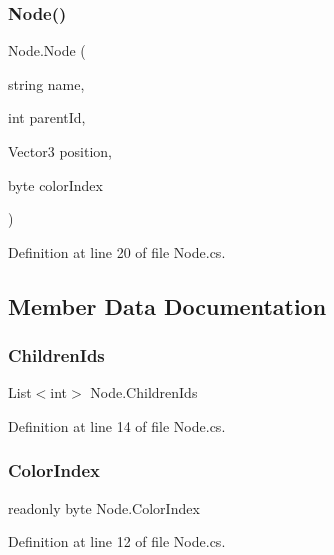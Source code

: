 \subsubsection{\texorpdfstring{Node()}{Node()}}
{\footnotesize\ttfamily Node.\+Node (\begin{DoxyParamCaption}\item[{string}]{name,  }\item[{int}]{parent\+Id,  }\item[{Vector3}]{position,  }\item[{byte}]{color\+Index }\end{DoxyParamCaption})}



Definition at line 20 of file Node.\+cs.



\subsection{Member Data Documentation}
\mbox{\label{class_node_ac49c69569aa07d54598b6b793ba26a31}} 
\subsubsection{\texorpdfstring{ChildrenIds}{ChildrenIds}}
{\footnotesize\ttfamily List$<$int$>$ Node.\+Children\+Ids}



Definition at line 14 of file Node.\+cs.

\mbox{\label{class_node_a2255f55bc7904392510365aa7c7069f6}} 
\subsubsection{\texorpdfstring{ColorIndex}{ColorIndex}}
{\footnotesize\ttfamily readonly byte Node.\+Color\+Index}



Definition at line 12 of file Node.\+cs.

\mbox{\label{class_node_ad1d0767136bf9f05acac77e77388a796}} 
